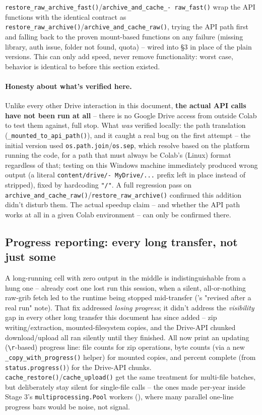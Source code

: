\documentclass[11pt]{article}
\begin{document}
\texttt{restore\_raw\_archive\_fast()}/\texttt{archive\_and\_cache\_-
raw\_fast()} wrap the API functions with the identical contract as
\texttt{restore\_raw\_archive()}/\texttt{archive\_and\_cache\_raw()},
trying the API path first and falling back to the proven mount-based
functions on any failure (missing library, auth issue, folder not found,
quota) -- wired into \S3 in place of the plain versions. This can only
add speed, never remove functionality: worst case, behavior is identical
to before this section existed.

\paragraph{Honesty about what's verified here.} Unlike every other Drive
interaction in this document, \textbf{the actual API calls have not been
run at all} -- there is no Google Drive access from outside Colab to
test them against, full stop. What \emph{was} verified locally: the path
translation (\texttt{\_mounted\_to\_api\_path()}), and it caught a real
bug on the first attempt -- the initial version used
\texttt{os.path.join}/\texttt{os.sep}, which resolve based on the
platform running the code, for a path that must always be Colab's
(Linux) format regardless of that; testing on this Windows machine
immediately produced wrong output (a literal \texttt{content/drive/-
MyDrive/...} prefix left in place instead of stripped), fixed by
hardcoding \texttt{"/"}. A full regression pass on
\texttt{archive\_and\_cache\_raw()}/\texttt{restore\_raw\_archive()}
confirmed this addition didn't disturb them. The actual speedup claim --
and whether the API path works at all in a given Colab environment --
can only be confirmed there.

\subsection{Progress reporting: every long transfer, not just some}
\label{sec:progress-reporting}

A long-running cell with zero output in the middle is indistinguishable
from a hung one -- already cost one lost run this session, when a
silent, all-or-nothing raw-grib fetch led to the runtime being stopped
mid-transfer ('s "revised after a real run"
note). That fix addressed \emph{losing progress}; it didn't address the
\emph{visibility} gap in every other long transfer this document has
since added -- zip writing/extraction, mounted-filesystem copies, and
the Drive-API chunked download/upload all ran silently until they
finished. All now print an updating (\texttt{\textbackslash r}-based)
progress line: file counts for zip operations, byte counts (via a new
\texttt{\_copy\_with\_progress()} helper) for mounted copies, and
percent complete (from \texttt{status.progress()}) for the Drive-API
chunks. \texttt{cache\_restore()}/\texttt{cache\_upload()} get the same
treatment for multi-file batches, but deliberately stay silent for
single-file calls -- the ones made per-year inside Stage 3's
\texttt{multiprocessing.Pool} workers (),
where many parallel one-line progress bars would be noise, not
signal.
\end{document}
